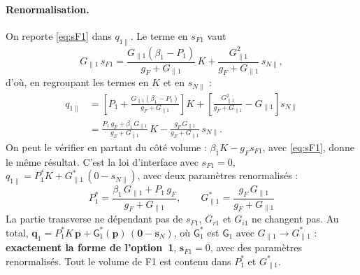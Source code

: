 \documentclass[11pt,a4paper]{article}
\newcommand{\vp}{\bm{p}}
\newcommand{\vs}{\bm{s}}
\newcommand{\vq}{\bm{q}}
\newcommand{\mG}{\mathsf{G}}
\begin{document}
\paragraph{Renormalisation.} On reporte \eqref{eq:sF1} dans $q_{1\parallel}$.
Le terme en $s_{F1}$ vaut
\begin{equation}
  G_{\parallel1}\,s_{F1}
  = \frac{G_{\parallel1}(\beta_1-P_1)}{g_F + G_{\parallel1}}\,K
  + \frac{G_{\parallel1}^2}{g_F + G_{\parallel1}}\,s_{N\parallel},
\end{equation}
d'où, en regroupant les termes en $K$ et en $s_{N\parallel}$ :
\begin{align}
  q_{1\parallel}
  &= \left[P_1 + \frac{G_{\parallel1}(\beta_1-P_1)}{g_F + G_{\parallel1}}\right]K
  + \left[\frac{G_{\parallel1}^2}{g_F + G_{\parallel1}} - G_{\parallel1}\right]s_{N\parallel}
  \nonumber\\
  &= \frac{P_1\,g_F + \beta_1\,G_{\parallel1}}{g_F + G_{\parallel1}}\,K
  - \frac{g_F\,G_{\parallel1}}{g_F + G_{\parallel1}}\,s_{N\parallel}.
\end{align}
On peut le vérifier en partant du côté volume : $\beta_1K - g_F s_{F1}$,
avec \eqref{eq:sF1}, donne le même résultat. C'est la loi d'interface avec
$s_{F1} = 0$,
$q_{1\parallel} = P_1^*K + G_{\parallel1}^*\,(0 - s_{N\parallel})$, avec deux
paramètres renormalisés :
\begin{equation}
  \boxed{\;
  P_1^* = \frac{\beta_1\,G_{\parallel1} + P_1\,g_F}{g_F + G_{\parallel1}},
  \qquad
  G_{\parallel1}^* = \frac{g_F\,G_{\parallel1}}{g_F + G_{\parallel1}}
  \;}
  \label{eq:renorm}
\end{equation}
La partie transverse ne dépendant pas de $s_{F1}$, $G_{r1}$ et $G_{i1}$ ne
changent pas. Au total, $\vq_1 = P_1^*K\,\vp + \mG_1^*(\vp)\,(\bm 0 - \vs_N)$,
où $\mG_1^*$ est $\mG_1$ avec $G_{\parallel1}\to G_{\parallel1}^*$ :
\textbf{exactement la forme de l'option~1}, $\vs_{F1}=0$, avec des paramètres
renormalisés. Tout le volume de F1 est contenu dans $P_1^*$ et
$G_{\parallel1}^*$.
\end{document}
